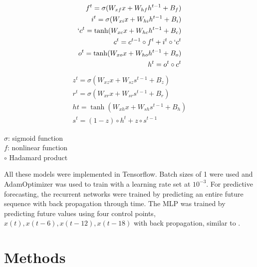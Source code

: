 \documentclass[11pt]{article}
\begin{document}
\begin{equation}
\begin{split}
f^{t} = \sigma(W_{xf}x + W_{hf}h^{t-1}+B_f) \\
i^{t} = \sigma(W_{xi}x + W_{hi}h^{t-1}+B_i) \\
`c^{t} = \tanh(W_{xc}x+W_{hc}h^{t-1}+B_c) \\
c^{t} = c^{t-1} \circ f^{t} + i^{t} \circ `c^{t} \\
o^{t}= \tanh (W_{xo}x + W_{ho}h^{t-1} + B_o) \\
h^{t} = o^{t} \circ c^{t}  \\
\end{split}
   \label{eq:LSTM_h}
\end{equation}
\begin{equation}
\begin{split}
  z^{t} = \sigma(W_{xz}x + W_{sz}s^{t-1} + B_z) \\
  r^{t} = \sigma(W_{xr}x + W_{sr}s^{t-1} + B_r) \\
  h{t} = \tanh(W_{xh}x + W_{sh}s^{t-1} + B_h) \\
  s^{t} = (1-z) \circ h^{t} + z \circ s^{t-1} 
\end{split}
\label{eq:GRU_h}
\end{equation}
\begin{center}$\sigma$: sigmoid function\\$f$: nonlinear function\\$\circ$ Hadamard product\end{center}
All these models were implemented in Tensorflow. Batch sizes of 1 were
used and AdamOptimizer \cite{adam} was used to train with a learning rate set at $10^{-3}$. For predictive forecasting, the recurrent networks
were trained by predicting an entire future sequence with back propagation through
time. The MLP was trained by predicting future values using four
control points, $x(t), x(t-6), x(t-12), x(t-18)$ with back propagation, similar to \cite{tr}.

\section {Methods}
\end{document}

